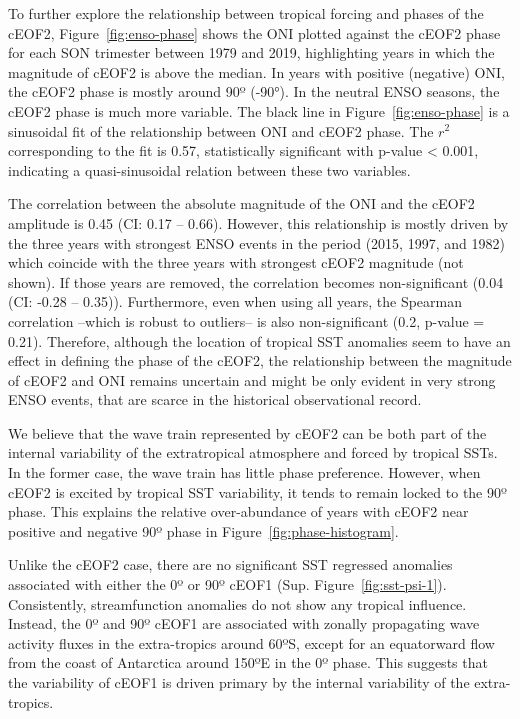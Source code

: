 \documentclass[pdflatex,sn-basic]{sn-jnl}
\theoremstyle{thmstyleone}%
\theoremstyle{thmstyletwo}%
\theoremstyle{thmstylethree}%
\begin{document}
To further explore the relationship between tropical forcing and phases of the cEOF2, Figure~\ref{fig:enso-phase} shows the ONI plotted against the cEOF2 phase for each SON trimester between 1979 and 2019, highlighting years in which the magnitude of cEOF2 is above the median.
In years with positive (negative) ONI, the cEOF2 phase is mostly around 90º (-90°).
In the neutral ENSO seasons, the cEOF2 phase is much more variable.
The black line in Figure~\ref{fig:enso-phase} is a sinusoidal fit of the relationship between ONI and cEOF2 phase.
The \(r^2\) corresponding to the fit is 0.57, statistically significant with p-value \textless{} 0.001, indicating a quasi-sinusoidal relation between these two variables.

The correlation between the absolute magnitude of the ONI and the cEOF2 amplitude is 0.45 (CI: 0.17 -- 0.66).
However, this relationship is mostly driven by the three years with strongest ENSO events in the period (2015, 1997, and 1982) which coincide with the three years with strongest cEOF2 magnitude (not shown).
If those years are removed, the correlation becomes non-significant (0.04 (CI: -0.28 -- 0.35)).
Furthermore, even when using all years, the Spearman correlation --which is robust to outliers-- is also non-significant (0.2, p-value = 0.21).
Therefore, although the location of tropical SST anomalies seem to have an effect in defining the phase of the cEOF2, the relationship between the magnitude of cEOF2 and ONI remains uncertain and might be only evident in very strong ENSO events, that are scarce in the historical observational record.

We believe that the wave train represented by cEOF2 can be both part of the internal variability of the extratropical atmosphere and forced by tropical SSTs.
In the former case, the wave train has little phase preference.
However, when cEOF2 is excited by tropical SST variability, it tends to remain locked to the 90º phase.
This explains the relative over-abundance of years with cEOF2 near positive and negative 90º phase in Figure~\ref{fig:phase-histogram}.

Unlike the cEOF2 case, there are no significant SST regressed anomalies associated with either the 0º or 90º cEOF1 (Sup. Figure~\ref{fig:sst-psi-1}).
Consistently, streamfunction anomalies do not show any tropical influence.
Instead, the 0º and 90º cEOF1 are associated with zonally propagating wave activity fluxes in the extra-tropics around 60ºS, except for an equatorward flow from the coast of Antarctica around 150ºE in the 0º phase.
This suggests that the variability of cEOF1 is driven primary by the internal variability of the extra-tropics.
\end{document}
